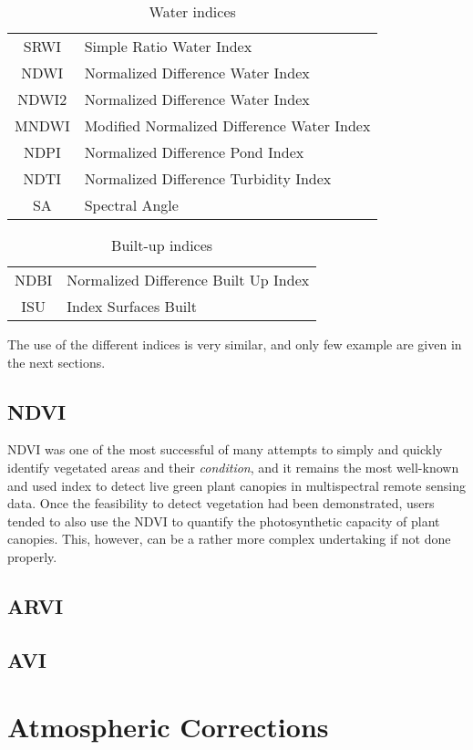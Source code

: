 \begin{table}[htb]
\centering
\begin{tabular}{|c|l|}
\hline
SRWI & Simple Ratio Water Index \cite{ZarcoTejada2001-SRWI} \\
NDWI & Normalized Difference Water Index  \cite{Gao1996-NDWI} \\
NDWI2 &  Normalized Difference Water Index \cite{McFeeters1996-NDWI2} \\
MNDWI &  Modified Normalized Difference Water Index  \cite{Xu2006-MNDWI} \\
NDPI &  Normalized Difference Pond Index \cite{Lacaux2007-NDTI} \\
NDTI &  Normalized Difference Turbidity Index  \cite{Lacaux2007-NDTI} \\
SA & Spectral Angle \\
\hline
\end{tabular}
\caption{Water indices}\label{tab:waterindices}
\end{table}

\begin{table}[htb]
\centering
\begin{tabular}{|c|l|}
\hline
NDBI &  Normalized Difference Built Up Index \cite{Zha2003-NDBI} \\
ISU &  Index Surfaces Built \cite{Abdellaoui1997-ISU} \\
\hline
\end{tabular}
\caption{Built-up indices}\label{tab:builtupindices}
\end{table}


The use of the different indices is very similar, and only few example are
given in the next sections.

\subsection{NDVI}
\label{secNDVI}
NDVI was one of the most successful of many attempts to simply and
quickly identify vegetated areas and their {\em condition}, and it remains
the most well-known and used index to detect live green plant canopies
in multispectral remote sensing data. Once the feasibility to detect
vegetation had been demonstrated, users tended to also use the NDVI to
quantify the photosynthetic capacity of plant canopies. This, however,
can be a rather more complex undertaking if not done properly.


\subsection{ARVI}
\label{secARVI}


\subsection{AVI}
\label{secAVI}





\section{Atmospheric Corrections}
\label{secAtmosphericCorrections}

